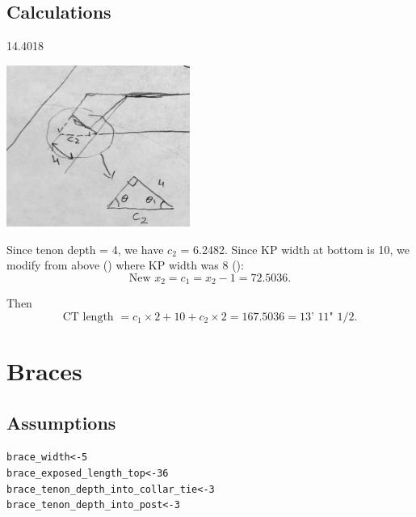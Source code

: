 \documentclass{article}\usepackage[]{graphicx}\usepackage[]{xcolor}
\makeatletter
\newcommand{\hlnum}[1]{\textcolor[rgb]{0.686,0.059,0.569}{#1}}%
\newcommand{\hlstd}[1]{\textcolor[rgb]{0.345,0.345,0.345}{#1}}%
\newcommand{\hlkwb}[1]{\textcolor[rgb]{0.69,0.353,0.396}{#1}}%
\newenvironment{kframe}{%
 \def\at@end@of@kframe{}%
 \ifinner\ifhmode%
  \def\at@end@of@kframe{\end{minipage}}%
  \begin{minipage}{\columnwidth}%
 \fi\fi%
 \def\FrameCommand##1{\hskip\@totalleftmargin \hskip-\fboxsep
 \colorbox{shadecolor}{##1}\hskip-\fboxsep
     \hskip-\linewidth \hskip-\@totalleftmargin \hskip\columnwidth}%
 \MakeFramed {\advance\hsize-\width
   \@totalleftmargin\z@ \linewidth\hsize
   \@setminipage}}%
 {\par\unskip\endMakeFramed%
 \at@end@of@kframe}
\newenvironment{knitrout}{}{} %
\makeatother
\begin{document}
\subsection{Calculations}



\begin{center}\end{center}


14.4018


\begin{center}\end{center}
\begin{center}
	\includegraphics[width=0.45\textwidth]{images/ct_cut_plan}
\end{center}

Since tenon depth = 4, we have $c_2$ = 6.2482. Since KP width at bottom is 10, we modify from above () where KP width was 8 ():
\[ \text{New }x_2 = c_1 = x_2 - 1 = 72.5036.  \]

Then 
\[ \boxed{\text{CT length }= c_1\times 2 + 10 + c_2\times 2 = 167.5036 = \text{13' 11" 1/2}.}\]

















\section{Braces} \label{braces}

\subsection{Assumptions}
\begin{knitrout}
\color{fgcolor}\begin{kframe}
\begin{alltt}
\hlstd{brace_width} \hlkwb{<-} \hlnum{5}
\hlstd{brace_exposed_length_top} \hlkwb{<-} \hlnum{36}
\hlstd{brace_tenon_depth_into_collar_tie} \hlkwb{<-} \hlnum{3}
\hlstd{brace_tenon_depth_into_post} \hlkwb{<-} \hlnum{3}
\end{alltt}
\end{kframe}
\end{knitrout}
\end{document}
